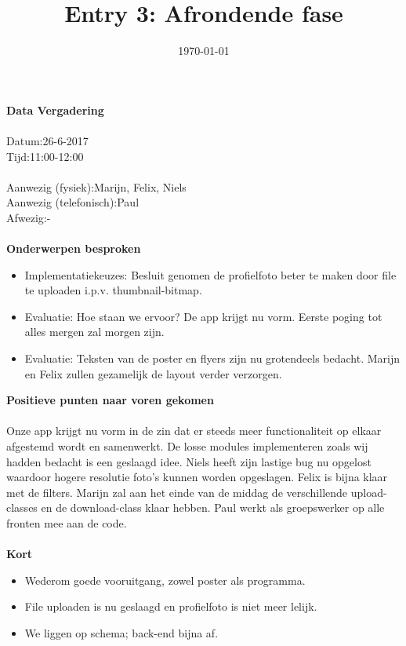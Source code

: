 \documentclass{uva-inf-article}
\title{Entry 3: Afrondende fase}
\date{\today}
\newcommand\tab[1][1cm]{\hspace*{#1}}
\newcommand\tabb[1][1.4cm]{\hspace*{#1}}
\begin{document}
\maketitle

\noindent
\textbf{Data Vergadering}\\\\
Datum:\tab 26-6-2017
\\
Tijd:\tabb 11:00-12:00
\\
\\
\noindent
Aanwezig (fysiek):\tabb\space\space\space Marijn, Felix, Niels\\
Aanwezig (telefonisch):\tab Paul\\
Afwezig:\tabb\tabb\space\space\space\space-\\\\
\noindent
\textbf{Onderwerpen besproken}

\begin{itemize}
\item Implementatiekeuzes:		Besluit genomen de profielfoto beter te maken door file te uploaden i.p.v. thumbnail-bitmap.
\item Evaluatie:		Hoe staan we ervoor? De app krijgt nu vorm. Eerste poging tot alles mergen zal morgen zijn.
\item Evaluatie: 	Teksten van de poster en flyers zijn nu grotendeels bedacht. Marijn en Felix zullen gezamelijk de layout verder verzorgen.
\end{itemize}
\pagebreak

\noindent
\textbf{Positieve punten naar voren gekomen}\\\\
Onze app krijgt nu vorm in de zin dat er steeds meer functionaliteit op elkaar afgestemd wordt en samenwerkt. De losse modules implementeren zoals wij hadden bedacht is een geslaagd idee. Niels heeft zijn lastige bug nu opgelost waardoor hogere resolutie foto's kunnen worden opgeslagen. Felix is bijna klaar met de filters. Marijn zal aan het einde van de middag de verschillende upload-classes en de download-class klaar hebben. Paul werkt als groepswerker op alle fronten mee aan de code.
\\\\

\noindent
\textbf{Kort}
\begin{itemize}
\item Wederom goede vooruitgang, zowel poster als programma.
\item File uploaden is nu geslaagd en profielfoto is niet meer lelijk.
\item We liggen op schema; back-end bijna af.
\end{itemize}
\end{document}

